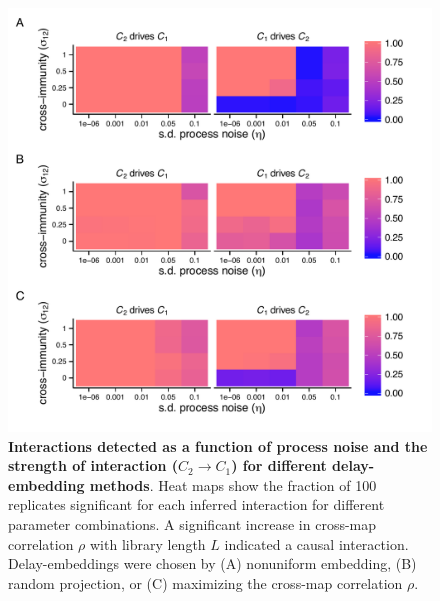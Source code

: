 \documentclass[10pt]{article}
\begin{document}
\begin{figure}
\begin{center}
  \includegraphics[width=5in]{dataflow/out/fig_detect_diffembed/fig_detect_diffembed.pdf}
  \end{center}
  \caption{\textbf{Interactions detected as a function of process noise and the strength of interaction ($C_2 \rightarrow C_1$) for different delay-embedding methods}. Heat maps show the fraction of 100 replicates significant for each inferred interaction for different parameter combinations. A significant increase in cross-map correlation $\rho$ with library length $L$ indicated a causal interaction. Delay-embeddings were chosen by (A) nonuniform embedding, (B) random projection, or (C) maximizing the cross-map correlation $\rho$.  \label{fig:crap_embeddings_tmp}}
\end{figure}
\end{document}
